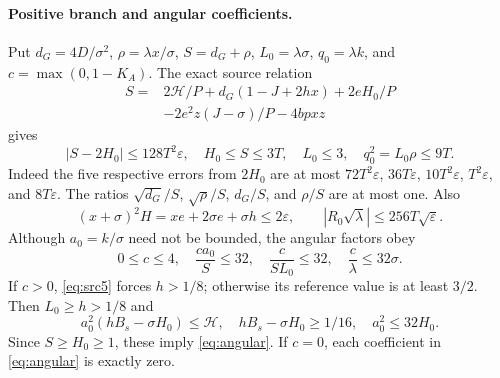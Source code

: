 \documentclass[11pt]{article}
\newcommand{\eps}{\varepsilon}
\newcommand{\sigs}{\sigma}
\begin{document}
\paragraph{Positive branch and angular coefficients.}
Put $d_G=4D/\sigs^2$, $\rho=\lambda x/\sigs$,
$S=d_G+\rho$, $L_0=\lambda\sigs$, $q_0=\lambda k$, and
$c=\max(0,1-K_A)$. The exact source relation
\begin{align*}
 S={}&2\mathcal H/P+d_G(1-J+2hx)+2eH_0/P\\
 &-2e^2z(J-\sigs)/P-4bpxz
\end{align*}
gives
\[
 |S-2H_0|\le128T^2\eps,\quad H_0\le S\le3T,
 \quad L_0\le3,\quad q_0^2=L_0\rho\le9T.
\]
Indeed the five respective errors from $2H_0$ are at most
$72T^2\eps$, $36T\eps$, $10T^2\eps$,
$T^2\eps$, and $8T\eps$.
The ratios $\sqrt{d_G}/S$, $\sqrt\rho/S$, $d_G/S$, and
$\rho/S$ are at most one.
Also
\[
 (x+\sigs)^2H=xe+2\sigs e+\sigs h\le2\eps,
 \qquad |R_0\sqrt\lambda|\le256T\sqrt\eps.
\]
Although $a_0=k/\sigs$ need not be bounded, the angular factors obey
\begin{equation}\label{eq:angular}
 0\le c\le4,\quad
 \frac{ca_0}{S}\le32,\quad
 \frac{c}{SL_0}\le32,\quad
 \frac c\lambda\le32\sigs.
\end{equation}
If $c>0$, \eqref{eq:src5} forces $h>1/8$; otherwise its reference
value is at least $3/2$. Then $L_0\ge h>1/8$ and
\[
 a_0^2(hB_s-\sigs H_0)\le\mathcal H,\quad
 hB_s-\sigs H_0\ge1/16,\quad
 a_0^2\le32H_0.
\]
Since $S\ge H_0\ge1$, these imply \eqref{eq:angular}.
If $c=0$, each coefficient in \eqref{eq:angular} is exactly zero.
\end{document}
